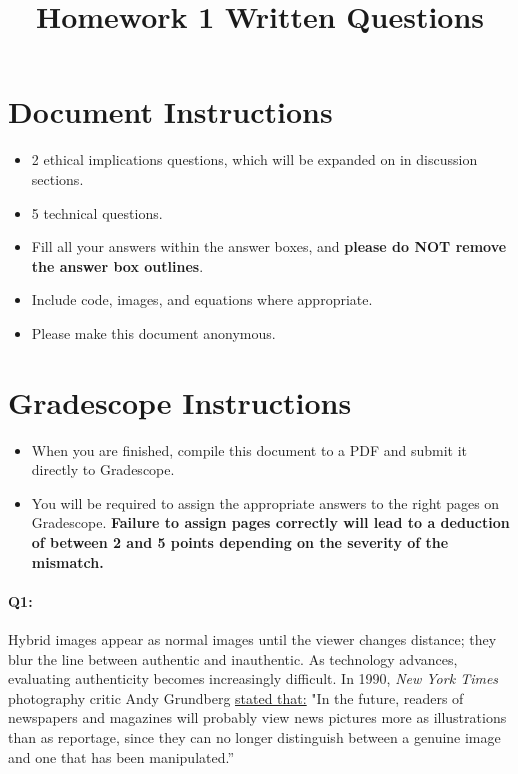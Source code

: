 \date{}

\title{\vspace{-1cm}Homework 1 Written Questions}



\maketitle
\vspace{-3cm}
\thispagestyle{fancy}

\section*{ Document Instructions}
\begin{itemize}
  \item 2 ethical implications questions, which will be expanded on in discussion sections.
  \item 5 technical questions.
  \item Fill all your answers within the answer boxes, and \textbf{please do NOT remove the answer box outlines}.
  \item Include code, images, and equations where appropriate.
  \item Please make this document anonymous.
\end{itemize}

\section*{ Gradescope Instructions}
\begin{itemize}
  \item When you are finished, compile this document to a PDF and submit it directly to Gradescope. 
  \item You will be required to assign the appropriate answers to the right pages on Gradescope. \textbf{Failure to assign pages correctly will lead to a deduction of between 2 and 5 points depending on the severity of the mismatch.}
\end{itemize}
\pagebreak

\paragraph{Q1:} Hybrid images appear as normal images until the viewer changes distance; they blur the line between authentic and inauthentic. As technology advances, evaluating authenticity becomes increasingly difficult. In 1990, \emph{New York Times} photography critic Andy Grundberg \href{https://www.nytimes.com/1990/08/12/arts/photography-view-ask-it-no-questions-the-camera-can-lie.html}{stated that:} "In the future, readers of newspapers and magazines will probably view news pictures more as illustrations than as reportage, since they can no longer distinguish between a genuine image and one that has been manipulated.''

